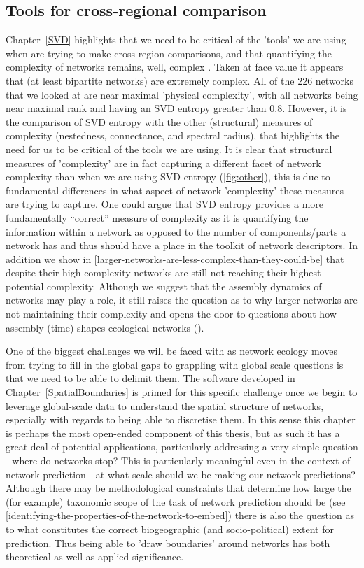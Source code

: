 \begin{refsection}
\subsection{Tools for cross-regional comparison}

Chapter~\ref{SVD} highlights that we need to be critical of the 'tools' we are using when are trying to make cross-region comparisons, and that quantifying the complexity of networks remains, well, complex \cite{Riva2023Cohesive}. Taken at face value it appears that (at least bipartite networks) are extremely complex. All of the 226 networks that we looked at are near maximal 'physical complexity', with all networks being near maximal rank and having an SVD entropy greater than 0.8. However, it is the comparison of SVD entropy with the other (structural) measures of complexity (nestedness, connectance, and spectral radius), that highlights the need for us to be critical of the tools we are using. It is clear that structural measures of 'complexity' are in fact capturing a different facet of network complexity than when we are using SVD entropy (\autoref{fig:other}), this is due to fundamental differences in what aspect of network 'complexity' these measures are trying to capture. One could argue that SVD entropy provides a more fundamentally “correct” measure of complexity as it is quantifying the information within a network as opposed to the number of components/parts a network has and thus should have a place in the toolkit of network descriptors. In addition we show in \autoref{larger-networks-are-less-complex-than-they-could-be} that despite their high complexity networks are still not reaching their highest potential complexity. Although we suggest that the assembly dynamics of networks may play a role, it still raises the question as to why larger networks are not maintaining their complexity and opens the door to questions about how assembly (time) shapes ecological networks (\cite{Barbier2018GenAss, Saravia2018EcoNet}).

One of the biggest challenges we will be faced with as network ecology moves from trying to fill in the global gaps to grappling with global scale questions is that we need to be able to delimit them. The software developed in Chapter~\ref{SpatialBoundaries} is primed for this specific challenge once we begin to leverage global-scale data to understand the spatial structure of networks, especially with regards to being able to discretise them. In this sense this chapter is perhaps the most open-ended component of this thesis, but as such it has a great deal of potential applications, particularly addressing a very simple question - where do networks stop? This is particularly meaningful even in the context of network prediction - at what scale should we be making our network predictions? Although there may be methodological constraints that determine how large the (for example) taxonomic scope of the task of network prediction should be (see \autoref{identifying-the-properties-of-the-network-to-embed}) there is also the question as to what constitutes the correct biogeographic (and socio-political) extent for prediction. Thus being able to 'draw boundaries' around networks has both theoretical as well as applied significance. 


\end{refsection}
